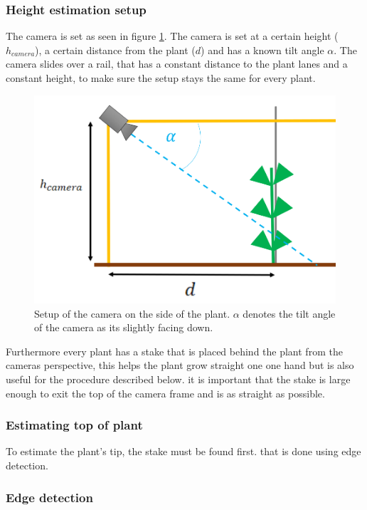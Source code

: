 \subsubsection{Height estimation setup}

The camera  is set as seen in figure \ref{fig:setupSide}. The camera is set at a certain height ($h_{camera}$), a certain distance from the plant ($d$) and has a known tilt angle $\alpha$. The camera slides over a rail, that has a constant distance to the plant lanes and a constant height, to make sure the setup stays the same for every plant.

\begin{figure}[H]
   \centering
   \includegraphics[scale=0.6]{setupSide.PNG}
   \caption{Setup of the camera on the side of the plant. $\alpha$ denotes the tilt angle of the camera as its slightly facing down. }
   \label{fig:setupSide}
\end{figure}

Furthermore every plant has a stake that is placed behind the plant from the cameras perspective, this helps the plant grow straight one one hand but is also useful for the procedure described below. it is important that the stake is large enough to exit the top of the camera frame and is as straight as possible.
\subsubsection{Estimating top of plant}
To estimate the plant's tip, the stake must be found first. that is done using edge detection.
\subsubsection{Edge detection}

